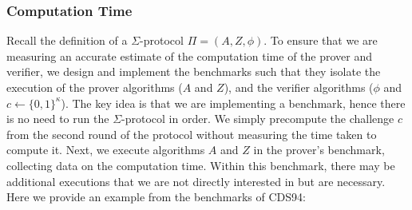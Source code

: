\subsubsection{Computation Time} Recall the definition of a $\Sigma$-protocol 
$\Pi = (A, Z, \phi)$. To ensure that we are measuring an accurate estimate 
of the computation time of the prover and verifier, we design and implement the 
benchmarks such that they isolate the execution of the prover algorithms ($A$ and $Z$), 
and the verifier algorithms ($\phi$ and $c \leftarrow \{0,1\}^\kappa$). The key idea 
is that we are implementing a benchmark, hence there is no need to run the 
$\Sigma$-protocol in 
order. We simply precompute the challenge $c$ from the second round of the protocol 
without measuring the time taken to compute it. Next, we execute algorithms $A$ and $Z$ 
in the prover's benchmark, collecting 
data on the computation time. Within this benchmark, 
there may be additional executions that we are not directly interested in but are 
necessary. 
Here we provide an example from the benchmarks of CDS94:


